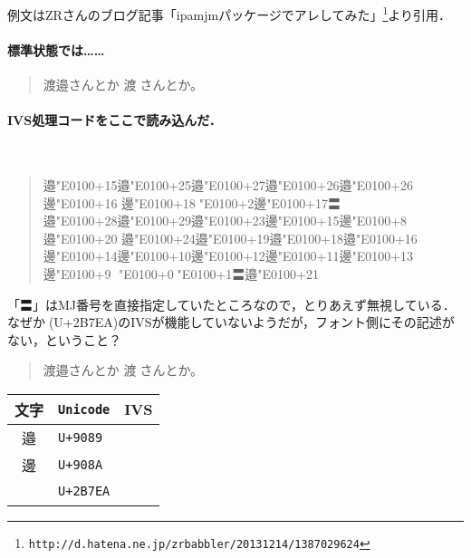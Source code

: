\documentclass{ltjsarticle}
\def\MJI[#1]#2{#2\char\numexpr "E0100+#1\relax}%
\def\IVSL#1{\directlua{list_ivs('#1')}}
\begin{document}

例文はZRさんのブログ記事「ipamjmパッケージでアレしてみた」\footnote{%
\verb+http://d.hatena.ne.jp/zrbabbler/20131214/1387029624+}より引用．

\paragraph{標準状態では……}
\begin{quote}
\LARGE
渡邉󠄏さんとか   %
渡𫟪󠄂さんとか。%
\end{quote}

\paragraph{IVS処理コードをここで読み込んだ．}\ 

\begin{quote}
\LARGE
\MJI[15]{邉}\MJI[25]{邉}\MJI[27]{邉}\MJI[26]{邉}\MJI[26]{邉}\MJI[16]{邊}
\MJI[18]{邊}\MJI[2]{𫟪}\MJI[17]{邊}〓\\
\MJI[28]{邉}\MJI[29]{邉}\MJI[23]{邉}\MJI[15]{邊}\MJI[8]{邊}\MJI[20]{邉}
\MJI[24]{邉}\MJI[19]{邉}\MJI[18]{邉}\MJI[16]{邉}\\
\MJI[14]{邊}\MJI[10]{邊}\MJI[12]{邊}\MJI[11]{邊}\MJI[13]{邊}\MJI[9]{邊}
\MJI[0]{𫟪}\MJI[1]{𫟪}〓\MJI[21]{邉}
\end{quote}
「〓」はMJ番号を直接指定していたところなので，とりあえず無視している．
なぜか𫟪(U+2B7EA)のIVSが機能していないようだが，フォント側にその記述がない，ということ？

\begin{quote}
\LARGE
渡邉󠄏さんとか   %
渡𫟪󠄂さんとか。%
\end{quote}

\begin{center}
\Large
\begin{tabular}{c>{\tt}ll}
\toprule
文字&Unicode&IVS\\
\midrule
邉&U+9089&\IVSL{邉}\\
邊&U+908A&\IVSL{邊}\\
𫟪&U+2B7EA&\IVSL{𫟪}\\
\bottomrule
\end{tabular}
\end{center}
\end{document}
